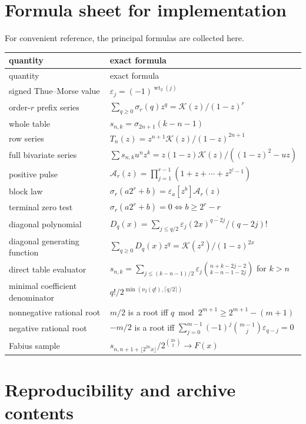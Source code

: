 \documentclass[11pt]{article}
\theoremstyle{definition}
\theoremstyle{remark}
\newcommand{\eps}{\varepsilon}
\newcommand{\K}{\mathcal K}
\newcommand{\A}{\mathcal A}
\newcommand{\Diag}{D}
\newcommand{\rising}[2]{#1^{\overline{#2}}}
\newcommand{\wt}{\operatorname{wt}_2}
\newcommand{\vTwo}{\nu_2}
\begin{document}
\appendix

\section{Formula sheet for implementation}
\label{app:formula-sheet}

For convenient reference, the principal formulas are collected here.

\begin{longtable}{p{}p{}}
\toprule
quantity & exact formula \\
\midrule
\endfirsthead
\toprule
quantity & exact formula \\
\midrule
\endhead
signed Thue--Morse value
& \(\eps_j=(-1)^{\wt(j)}\) \\
order-\(r\) prefix series
& \(\sum_{q\geq0}\sigma_r(q)z^q=\K(z)/(1-z)^r\) \\
whole table
& \(s_{n,k}=\sigma_{2n+1}(k-n-1)\) \\
row series
& \(T_n(z)=z^{n+1}\K(z)/(1-z)^{2n+1}\) \\
full bivariate series
& \(\sum s_{n,k}u^nz^k=z(1-z)\K(z)/((1-z)^2-uz)\) \\
positive pulse
& \(\A_r(z)=\prod_{j=1}^{r-1}(1+z+\cdots+z^{2^j-1})\) \\
block law
& \(\sigma_r(a2^r+b)=\eps_a[z^b]\A_r(z)\) \\
terminal zero test
& \(\sigma_r(a2^r+b)=0\iff b\geq2^r-r\) \\
diagonal polynomial
& \(\Diag_q(x)=\sum_{j\leq q/2}\eps_j\rising{(2x)}{q-2j}/(q-2j)!\) \\
diagonal generating function
& \(\sum_{q\geq0}\Diag_q(x)z^q=\K(z^2)/(1-z)^{2x}\) \\
direct table evaluator
& \(s_{n,k}=\sum_{j\leq(k-n-1)/2}\eps_j
\binom{n+k-2j-2}{k-n-1-2j}\) for \(k>n\) \\
minimal coefficient denominator
& \(q!/2^{\min(\vTwo(q!),\lceil q/2\rceil)}\) \\
nonnegative rational root
& \(m/2\) is a root iff
\(q\bmod2^{m+1}\geq2^{m+1}-(m+1)\) \\
negative rational root
& \(-m/2\) is a root iff
\(\sum_{j=0}^{m-1}(-1)^j\binom{m-1}{j}\eps_{q-j}=0\) \\
Fabius sample
& \(s_{n,n+1+\lfloor2^{2n}x\rfloor}/2^{\binom{2n}{2}}\to F(x)\) \\
\bottomrule
\end{longtable}

\section{Reproducibility and archive contents}
\label{app:archive}
\end{document}
